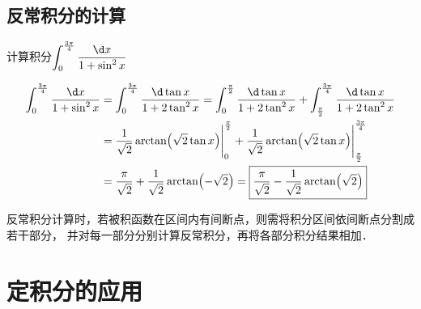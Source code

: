 \documentclass[12pt, a4paper, oneside, UTF8]{ctexbook}
\begin{document}
\subsection{反常积分的计算}
\begin{example}
    计算积分$\displaystyle\int_{0}^{\frac{3\pi}{4}} \dfrac{\d x}{1 + \sin^2 x}$
\end{example}
\begin{solution}
    \begin{align*}
        \int_{0}^{\frac{3\pi}{4}} \dfrac{\d x}{1 + \sin^2 x}
        &=\int_{0}^{\frac{3\pi}{4}} \dfrac{\d \tan x}{1 + 2\tan^2 x}
        =\int_{0}^{\frac{\pi}{2}} \dfrac{\d \tan x}{1 + 2\tan^2 x} + \int_{\frac{\pi}{2}}^{\frac{3\pi}{4}} \dfrac{\d \tan x}{1 + 2\tan^2 x}\\
        &=\dfrac{1}{\sqrt{2}} \arctan (\sqrt{2} \tan x) \Bigg|_{0}^{\frac{\pi}{2}} + \dfrac{1}{\sqrt{2}} \arctan (\sqrt{2} \tan x) \Bigg|_{\frac{\pi}{2}}^{\frac{3\pi}{4}}\\
        &=\dfrac{\pi}{\sqrt{2}} + \dfrac{1}{\sqrt{2}}\arctan (-\sqrt{2})
        =\boxed{\dfrac{\pi}{\sqrt{2}} - \dfrac{1}{\sqrt{2}} \arctan (\sqrt{2})}
    \end{align*}
\end{solution}
\begin{myRemark}
    反常积分计算时，若被积函数在区间内有间断点，则需将积分区间依间断点分割成若干部分，
    并对每一部分分别计算反常积分，再将各部分积分结果相加．
\end{myRemark}
\section{定积分的应用}
\end{document}

